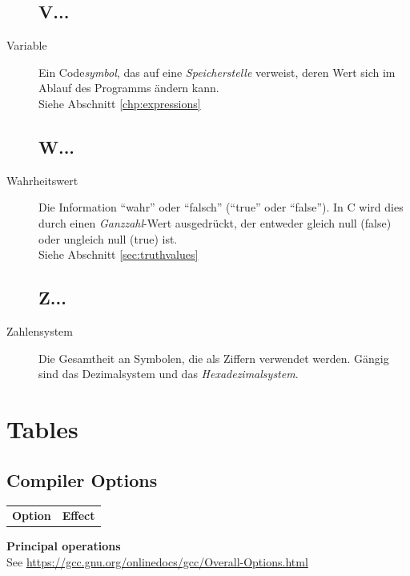\begin{appendices}
\begin{description}
\section*{V...}
\item[Variable] Ein Code\emph{symbol}, das auf eine \emph{Speicherstelle} verweist, deren Wert sich
	im Ablauf des Programms ändern kann.\\
	Siehe Abschnitt \ref{chp:expressions}

\section*{W...}
\item[Wahrheitswert] Die Information \enquote{wahr} oder \enquote{falsch} (\enquote{true} oder
	\enquote{false}). In C wird dies durch einen \emph{Ganzzahl}-Wert ausgedrückt, der entweder gleich
	null (false) oder ungleich null (true) ist.\\
	Siehe Abschnitt \ref{sec:truthvalues}

\section*{Z...}
\item[Zahlensystem] Die Gesamtheit an Symbolen, die als Ziffern verwendet werden. Gängig sind das
	Dezimalsystem und das \emph{Hexadezimalsystem}.
\end{description}



\chapter{Tables}
\section{Compiler Options}
{

\begin{tabularx}
	{\linewidth}
	{OE}
	\toprule[1.5pt]

	\normalfont	\bfseries Option &
				\bfseries Effect
	\tabcrlf
\end{tabularx}

\vspace{12pt}
\textbf{Principal operations} \\
See \url{https://gcc.gnu.org/onlinedocs/gcc/Overall-Options.html}

}
\end{appendices}

